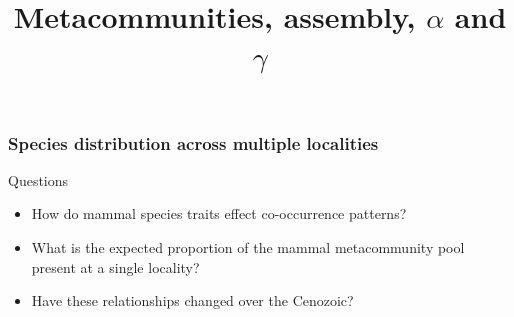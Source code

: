 \documentclass{beamer}
\title{Metacommunities, assembly, \(\alpha\) and \(\gamma\)}
\begin{document}
\begin{frame}
  \maketitle
\end{frame}

\begin{frame}
  \frametitle{Species distribution across multiple localities}

  \begin{block}{Questions}
    \begin{itemize}
      \item How do mammal species traits effect co-occurrence patterns?
      \item What is the expected proportion of the mammal metacommunity pool present at a single locality?
      \item Have these relationships changed over the Cenozoic?
    \end{itemize}
  \end{block}
\end{frame}
\end{document}
